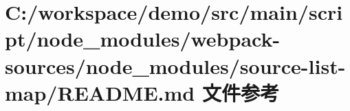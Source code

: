 \hypertarget{node__modules_2webpack-sources_2node__modules_2source-list-map_2_r_e_a_d_m_e_8md}{}\section{C\+:/workspace/demo/src/main/script/node\+\_\+modules/webpack-\/sources/node\+\_\+modules/source-\/list-\/map/\+R\+E\+A\+D\+ME.md 文件参考}
\label{node__modules_2webpack-sources_2node__modules_2source-list-map_2_r_e_a_d_m_e_8md}
